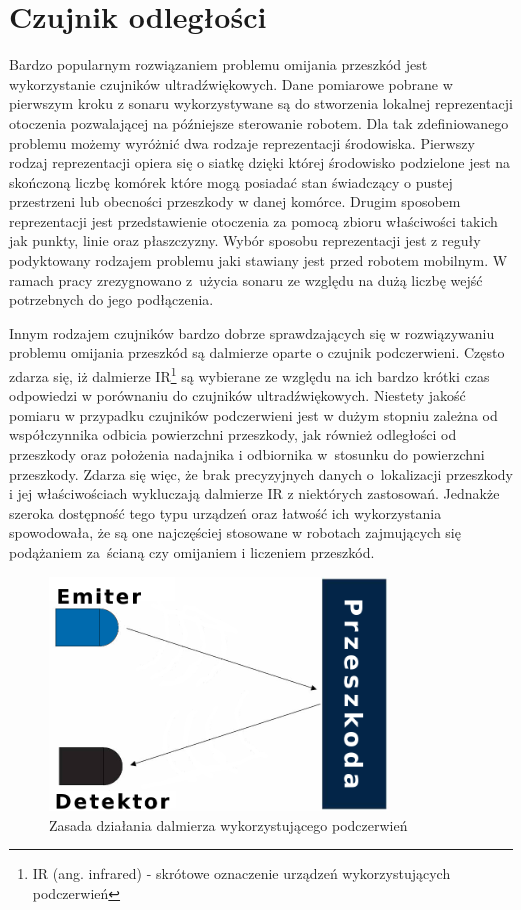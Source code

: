 \section{Czujnik odległości}
\label{sec:ir-sensors}
Bardzo popularnym rozwiązaniem problemu omijania przeszkód jest wykorzystanie
czujników ultradźwiękowych. Dane pomiarowe pobrane w pierwszym kroku z sonaru
wykorzystywane są do stworzenia lokalnej reprezentacji otoczenia pozwalającej na
późniejsze sterowanie robotem\cite{ObstaclesAvoidanceIR}. Dla tak zdefiniowanego
problemu możemy wyróżnić dwa rodzaje reprezentacji środowiska. Pierwszy rodzaj
reprezentacji opiera się o siatkę dzięki której środowisko podzielone jest na
skończoną liczbę komórek które mogą posiadać stan świadczący o pustej przestrzeni
lub obecności przeszkody w danej komórce. Drugim sposobem reprezentacji jest
przedstawienie otoczenia za pomocą zbioru właściwości takich jak punkty, linie
oraz płaszczyzny. Wybór sposobu reprezentacji jest z reguły podyktowany
rodzajem problemu jaki stawiany jest przed robotem mobilnym. W ramach pracy
zrezygnowano z~użycia sonaru ze względu na dużą liczbę wejść
potrzebnych do jego podłączenia.

Innym rodzajem czujników bardzo dobrze sprawdzających się w rozwiązywaniu
problemu omijania przeszkód są dalmierze oparte o czujnik podczerwieni. Często
zdarza się, iż dalmierze IR\footnote{IR (ang. infrared) - skrótowe oznaczenie
urządzeń wykorzystujących podczerwień} są wybierane ze
względu na ich bardzo krótki czas odpowiedzi w porównaniu do czujników
ultradźwiękowych. Niestety jakość pomiaru w przypadku
czujników podczerwieni jest w dużym stopniu zależna od współczynnika odbicia
powierzchni przeszkody, jak również odległości od przeszkody oraz położenia
nadajnika i odbiornika w~stosunku do powierzchni przeszkody. Zdarza się więc, że
brak precyzyjnych danych o~lokalizacji przeszkody i jej właściwościach
wykluczają dalmierze IR z niektórych zastosowań. Jednakże szeroka dostępność
tego typu urządzeń oraz łatwość ich wykorzystania spowodowała, że są one
najczęściej stosowane w robotach zajmujących się podążaniem za~ścianą czy
omijaniem i liczeniem przeszkód.

\begin{figure}[h!]
 \centering
 \includegraphics[height=62mm]{../images/ch04/ir_sensor.png}
 \caption{Zasada działania dalmierza wykorzystującego podczerwień}
 \label{fig:IRSensors}
\end{figure}


